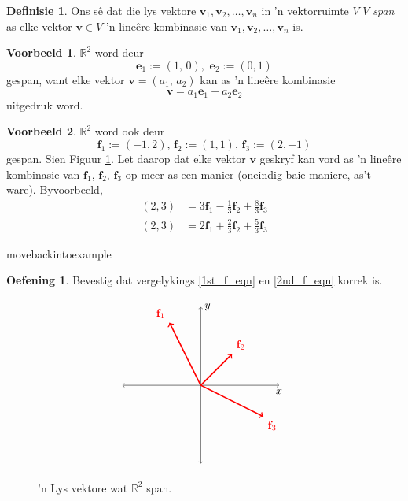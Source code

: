 \documentclass[a4paper,11pt]{book}
\theoremstyle{definition}
\newtheorem{definition}[theorem]{Definisie}
\newtheorem{exercise}{Oefening}
\newtheorem{example_environment}{Voorbeeld}[chapter]
\newcommand{\ve}[1]{\mathbf{#1}}
\newenvironment{example}
	{
		\begin{oframed}
		\begin{example_environment}
	}
	{
		\end{example_environment}
		\end{oframed}
	}
\begin{document}
\begin{definition} Ons s{\^e} dat die lys vektore $\ve{v}_1, \ve{v}_2,
	\ldots, \ve{v}_n$ in 'n vektorruimte $V$ $V$ \emph{span} as elke
	vektor $\ve{v} \in V$ 'n line{\^e}re kombinasie van $\ve{v}_1,
	\ve{v}_2, \ldots, \ve{v}_n$ is.
\end{definition}

\begin{example} $\mathbb{R}^2$ word deur
\[
 \ve{e}_1 := (1, \, 0), \, \, \ve{e}_2 := (0, 1)
\]
gespan, want elke vektor $\ve{v} = (a_1, \, a_2)$ kan as 'n line{\^e}re
	kombinasie
\[
 \ve{v} = a_1 \ve{e}_1 + a_2 \ve{e}_2
\]
uitgedruk word.
\end{example}
\begin{example} $\mathbb{R}^2$ word ook deur
	\label{three_vectors_spanning_R2_example}
	\[
		\ve{f}_1 := (-1, 2), \, \ve{f}_2 := (1, 1), \, \ve{f}_3 := (2, -1)
	\]
	gespan.
	Sien Figuur \ref{spanning_set_R2}. Let daarop dat elke vektor $\ve{v}$
	geskryf kan vord as 'n line{\^e}re kombinasie van $\ve{f}_1$,
	$\ve{f}_2$, $\ve{f}_3$ op meer as een manier (oneindig baie maniere,
	as't ware). Byvoorbeeld,
	\begin{align}
		(2, 3) &= 3 \ve{f}_1  - \frac{1}{3} \ve{f}_2 + \frac{8}{3} \ve{f}_3
		\label{1st_f_eqn} \\
		(2,3) &= 2 \ve{f}_1 + \frac{2}{3} \ve{f}_2 + \frac{5}{3} \ve{f}_3
		\label{2nd_f_eqn}
	\end{align}


\end{example}movebackintoexample
	\begin{exercise}
	Bevestig dat vergelykings \eqref{1st_f_eqn} en \eqref{2nd_f_eqn}
	korrek is.
\end{exercise}
\begin{figure}[t]
	\[
		\begin{tikzpicture}
			\draw[<->] (-2.5, 0) -- (2.5,0) node[below] {$x$};
			\draw[<->] (0, -2.5) -- (0, 2.5) node[right] {$y$};
			\draw[very thick, red, ->] (0,0) -- (-1, 2) node[above left]
			{$\ve{f}_1$};
			\draw[very thick, red, ->] (0,0) -- (1, 1) node[above right]
			{$\ve{f}_2$};
			\draw[very thick, red, ->] (0,0) -- (2, -1) node[below right]
			{$\ve{f}_3$};
		\end{tikzpicture}
	\]
 \caption{\label{spanning_set_R2}'n Lys vektore wat $\mathbb{R}^2$ span.}
 \end{figure}
\end{document}

